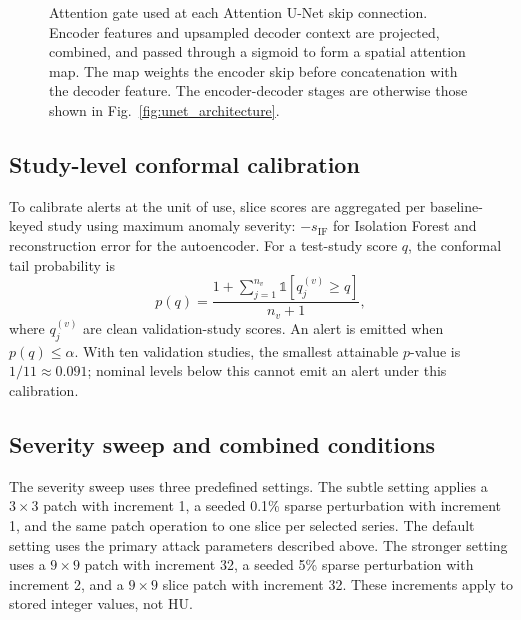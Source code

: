 \documentclass[journal]{IEEEtran}
\begin{document}
\begin{figure}[t]
{%
  }
  \caption{Attention gate used at each Attention U-Net skip connection. Encoder features and upsampled decoder context are projected, combined, and passed through a sigmoid to form a spatial attention map. The map weights the encoder skip before concatenation with the decoder feature. The encoder-decoder stages are otherwise those shown in Fig.~\ref{fig:unet_architecture}.}
  \label{fig:attention_gate}
  \end{figure}
  
  \subsection{Study-level conformal calibration}
  To calibrate alerts at the unit of use, slice scores are aggregated per baseline-keyed study using maximum anomaly severity: $-s_{\mathrm{IF}}$ for Isolation Forest and reconstruction error for the autoencoder. For a test-study score $q$, the conformal tail probability is
  \begin{equation}
  p(q)=\frac{1+\sum_{j=1}^{n_v}\mathbb{1}[q_j^{(v)}\ge q]}{n_v+1},
  \end{equation}
  where $q_j^{(v)}$ are clean validation-study scores. An alert is emitted when $p(q)\le\alpha$. With ten validation studies, the smallest attainable $p$-value is $1/11\approx0.091$; nominal levels below this cannot emit an alert under this calibration.
  
  \subsection{Severity sweep and combined conditions}
  The severity sweep uses three predefined settings. The subtle setting applies a $3\times3$ patch with increment 1, a seeded 0.1\% sparse perturbation with increment 1, and the same patch operation to one slice per selected series. The default setting uses the primary attack parameters described above. The stronger setting uses a $9\times9$ patch with increment 32, a seeded 5\% sparse perturbation with increment 2, and a $9\times9$ slice patch with increment 32. These increments apply to stored integer values, not HU.
  
\end{document}

